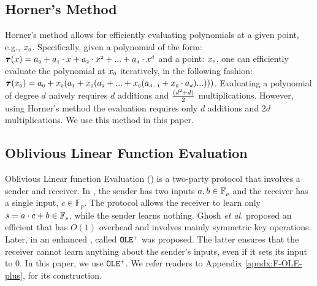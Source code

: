 \vspace{-3mm}

\subsection{Horner's Method}
\vspace{-.5mm}

Horner's method \cite{DBLP:journals/ibmrd/Dorn62} allows for efficiently evaluating polynomials at a given point, e.g., $x_{\scriptscriptstyle 0}$. Specifically, given a polynomial of the form: $\bm\tau(x)= a_{\scriptscriptstyle 0}+a_{\scriptscriptstyle 1}\cdot x+a_{\scriptscriptstyle 2}\cdot x^{\scriptscriptstyle 2}+...+a_{\scriptscriptstyle d}\cdot x^{\scriptscriptstyle d}$ and a point: $x_{\scriptscriptstyle 0}$, one can efficiently evaluate the polynomial at $x_{\scriptscriptstyle 0}$ iteratively, in the following fashion: $\bm\tau(x_{\scriptscriptstyle 0})=a_{\scriptscriptstyle 0}+x_{\scriptscriptstyle 0}(a_{\scriptscriptstyle 1} + x_{\scriptscriptstyle 0}(a_{\scriptscriptstyle 2}+...+x_{\scriptscriptstyle 0}(a_{\scriptscriptstyle d-1}+x_{\scriptscriptstyle 0}\cdot a_{\scriptscriptstyle d})...)))$. Evaluating  a polynomial of degree $d$ naively requires  $d$ additions and $\frac{(d^{\scriptscriptstyle 2}+d)}{2}$ multiplications. However, using Horner's method the evaluation requires only $d$ additions and $2d$ multiplications. We use this method in this paper. 

\vspace{-3mm}

\subsection{Oblivious Linear Function Evaluation}\label{sec::OLE-plus}
\vspace{-.5mm}

Oblivious Linear function Evaluation (\ole) is a two-party protocol that involves a sender and receiver. In \ole,  the sender  has two  inputs  $a, b\in \mathbb{F}_{\scriptscriptstyle p}$ and the receiver has a single input, $c \in \mathbb{F}_{p}$.  The protocol allows the receiver to learn only $s = a\cdot c + b \in \mathbb{F}_{\scriptscriptstyle p}$, while the sender learns nothing. Ghosh \textit{et al.} \cite{GhoshNN17} proposed an efficient \ole that has $O(1)$ overhead and involves mainly symmetric key operations. Later, in \cite{GhoshN19} an enhanced \ole, called $\mathtt{OLE}^{\scriptscriptstyle +}$ was proposed. The latter ensures that the receiver cannot learn anything about the sender's inputs,  even if it sets its input to $0$. In this paper, we use $\mathtt{OLE}^{\scriptscriptstyle +}$. We refer readers to Appendix \ref{apndx:F-OLE-plus}, for its construction.  %

\vspace{-1mm}













